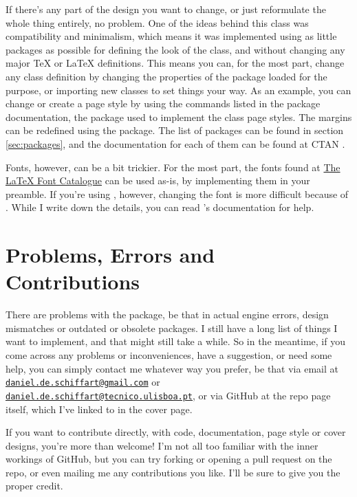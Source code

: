 \documentclass[palatino,english]{ist-report}
\begin{document}
If there's any part of the design you want to change, or just reformulate the whole thing entirely, no problem. One of the ideas behind this class was compatibility and minimalism, which means it was implemented using as little packages as possible for defining the look of the class, and without changing any major \TeX{} or \LaTeX{} definitions. This means you can, for the most part, change any class definition by changing the properties of the package loaded for the purpose, or importing new classes to set things your way. As an example, you can change or create a page style by using the commands listed in the  package documentation, the package used to implement the class page styles. The margins can be redefined using the  package. The list of packages can be found in section \ref{sec:packages}, and the documentation for each of them can be found at CTAN \cite{ctan}.

Fonts, however, can be a bit trickier. For the most part, the fonts found at \href{http://www.tug.dk/FontCatalogue/}{The \LaTeX{} Font Catalogue} can be used as-is, by implementing them in your preamble. If you're using \XeLaTeX{}, however, changing the font is more difficult because of . While I write down the details, you can read 's documentation for help.

\section{Problems, Errors and Contributions}

There are problems with the package, be that in actual engine errors, design mismatches or outdated or obsolete packages. I still have a long list of things I want to implement, and that might still take a while. So in the meantime, if you come across any problems or inconveniences, have a suggestion, or need some help, you can simply contact me whatever way you prefer, be that via email at \href{mailto:daniel.de.schiffart@gmail.com}{\texttt{daniel.de.schiffart@gmail.com}} or \href{mailto:daniel.de.schiffart@tecnico.ulisboa.pt}{\texttt{daniel.de.schiffart@tecnico.ulisboa.pt}}, or via GitHub at the repo page itself, which I've linked to in the cover page.

If you want to contribute directly, with code, documentation, page style or cover designs, you're more than welcome! I'm not all too familiar with the inner workings of GitHub, but you can try forking or opening a pull request on the repo, or even mailing me any contributions you like. I'll be sure to give you the proper credit.
\end{document}
